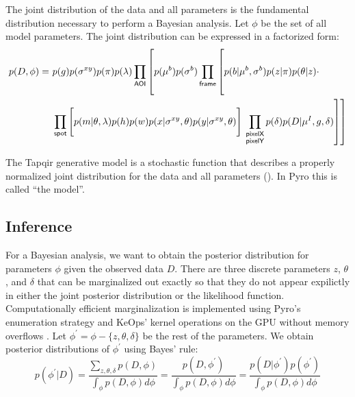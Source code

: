 The joint distribution of the data and all parameters is the fundamental distribution necessary to perform a Bayesian analysis.  Let $\phi$ be the set of all model parameters. The joint distribution can be expressed in a factorized form:
%
\begin{equation}
\begin{aligned}
    p(D, \phi) =~&p(g) p(\sigma^{xy}) p(\pi) p(\lambda) \prod_{\mathsf{AOI}} \left[ p(\mu^b) p(\sigma^b) \prod_{\mathsf{frame}} \left[ \vphantom{\prod_{F}} p(b | \mu^b, \sigma^b) p(z | \pi) p(\theta | z) \vphantom{\prod_{\substack{\mathsf{pixelX} \\ \mathsf{pixelY}}}} \cdot \right. \right. \\
    &\prod_{\mathsf{spot}} \left[ \vphantom{\prod_{F}} p(m | \theta, \lambda) p(h) p(w) p(x | \sigma^{xy}, \theta) p(y | \sigma^{xy}, \theta) \right] \left. \left. \prod_{\substack{\mathsf{pixelX} \\ \mathsf{pixelY}}} p(\delta) p(D | \mu^I, g, \delta) \right] \right]
\end{aligned}
\end{equation}

The Tapqir generative model is a stochastic function that describes a properly normalized joint distribution for the data and all parameters (). In Pyro this is called ``the model''.
 


\subsection{Inference}

For a Bayesian analysis, we want to obtain the posterior distribution for parameters $\phi$ given the observed data $D$. There are three discrete parameters $z$, $\theta$, and $\delta$ that can be marginalized out exactly so that they do not appear expilictly in either the joint posterior distribution or the likelihood function. Computationally efficient marginalization is implemented using Pyro's enumeration strategy \citep{Obermeyer2019-xt} and KeOps' kernel operations on the GPU without memory overflows \citep{Charlier2021-vq}. Let $\phi^{\prime} = \phi - \{ z, \theta, \delta \}$ be the rest of the parameters. We obtain posterior distributions of $\phi^{\prime}$ using Bayes' rule:
%
\begin{equation}
    p(\phi^{\prime} | D) =
    \dfrac{\sum_{z, \theta, \delta} p(D, \phi)}{\int_{\phi} p(D, \phi) d\phi} =
    \dfrac{p(D, \phi^{\prime})}{\int_{\phi} p(D, \phi) d\phi} =
    \dfrac{p(D| \phi^{\prime} )p(\phi^{\prime})}{\int_{\phi} p(D, \phi) d\phi}
\end{equation}

